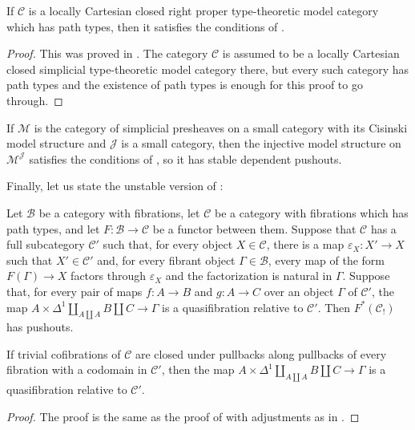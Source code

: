 \documentclass[reqno]{amsart}
\theoremstyle{definition}
\theoremstyle{remark}
\newcommand{\scat}[1]{\mathcal{#1}}
\numberwithin{figure}{section}
\begin{document}
\begin{lem}
If $\scat{C}$ is a locally Cartesian closed right proper type-theoretic model category which has path types, then it satisfies the conditions of .
\end{lem}
\begin{proof}
This was proved in \cite[Theorem~4.2]{lum-shul-hits}.
The category $\scat{C}$ is assumed to be a locally Cartesian closed simplicial type-theoretic model category there, but every such category has path types and the existence of path types is enough for this proof to go through.
\end{proof}

\begin{example}
If $\scat{M}$ is the category of simplicial presheaves on a small category with its Cisinski model structure \cite{cisinski-presheaf,cisinski} and $\scat{J}$ is a small category,
then the injective model structure on $\scat{M}^\scat{J}$ satisfies the conditions of , so it has stable dependent pushouts.
\end{example}

Finally, let us state the unstable version of :

\begin{lem}
Let $\scat{B}$ be a category with fibrations, let $\scat{C}$ be a category with fibrations which has path types, and let $F : \scat{B} \to \scat{C}$ be a functor between them.
Suppose that $\scat{C}$ has a full subcategory $\scat{C}'$ such that, for every object $X \in \scat{C}$, there is a map $\varepsilon_X : X' \to X$ such that $X' \in \scat{C}'$ and,
for every fibrant object $\Gamma \in \scat{B}$, every map of the form $F(\Gamma) \to X$ factors through $\varepsilon_X$ and the factorization is natural in $\Gamma$.
Suppose that, for every pair of maps $f : A \to B$ and $g : A \to C$ over an object $\Gamma$ of $\scat{C}'$, the map $A \times \Delta^1 \amalg_{A \amalg A} B \amalg C \to \Gamma$ is a quasifibration relative to $\scat{C}'$.
Then $F^*(\scat{C}_!)$ has pushouts.

If trivial cofibrations of $\scat{C}$ are closed under pullbacks along pullbacks of every fibration with a codomain in $\scat{C}'$, then the map $A \times \Delta^1 \amalg_{A \amalg A} B \amalg C \to \Gamma$ is a quasifibration relative to $\scat{C}'$.
\end{lem}
\begin{proof}
The proof is the same as the proof of  with adjustments as in .
\end{proof}
\end{document}
